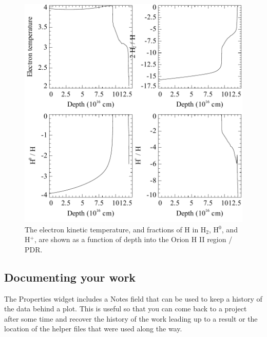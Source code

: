 \begin{figure}
\begin{center}
\includegraphics[clip=on,width=0.8\columnwidth,height=0.8\textheight,keepaspectratio]{orion_hii_pdr_pp}
\end{center}
\caption{The electron kinetic temperature, and fractions of H in H$_2$,
H$^0$, and H$^+$, are shown as a function of depth into the 
Orion H II region / PDR.}
\label{fig:orion_hii_pdr_pp}
\end{figure}


\subsection{Documenting your work}

The Properties widget includes a Notes field that can be used to keep a history of the 
data behind a plot.
This is useful so that you can come back to a project after some time and recover
the history of the work leading up to a result or the location of the helper files that were used
along the way.

%
